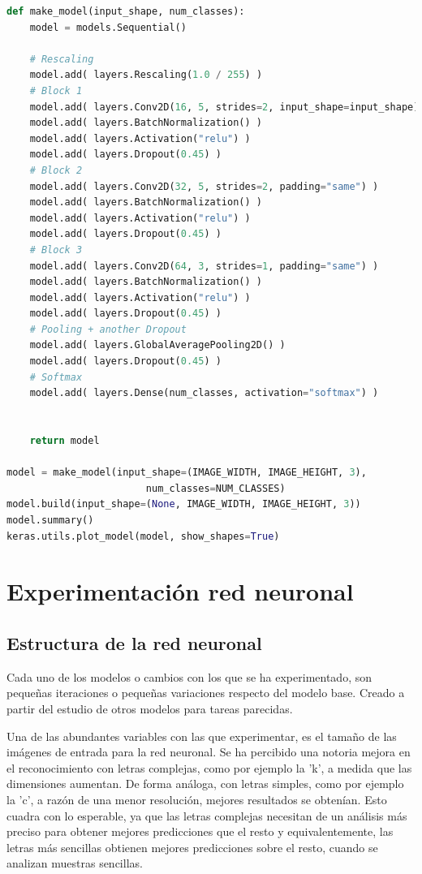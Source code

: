 \begin{appendices}
\begin{lstlisting}[language=python, title=Fragmento de \href{https://github.com/AntonioPriego/SmartPen/blob/main/Train/Train.ipynb}{\textit{Train.ipynb}}]
def make_model(input_shape, num_classes):
    model = models.Sequential()

    # Rescaling
    model.add( layers.Rescaling(1.0 / 255) )
    # Block 1
    model.add( layers.Conv2D(16, 5, strides=2, input_shape=input_shape) )
    model.add( layers.BatchNormalization() )
    model.add( layers.Activation("relu") )
    model.add( layers.Dropout(0.45) )
    # Block 2
    model.add( layers.Conv2D(32, 5, strides=2, padding="same") )
    model.add( layers.BatchNormalization() )
    model.add( layers.Activation("relu") )
    model.add( layers.Dropout(0.45) )
    # Block 3
    model.add( layers.Conv2D(64, 3, strides=1, padding="same") )
    model.add( layers.BatchNormalization() )
    model.add( layers.Activation("relu") )
    model.add( layers.Dropout(0.45) )
    # Pooling + another Dropout
    model.add( layers.GlobalAveragePooling2D() )
    model.add( layers.Dropout(0.45) )
    # Softmax
    model.add( layers.Dense(num_classes, activation="softmax") )


    return model

model = make_model(input_shape=(IMAGE_WIDTH, IMAGE_HEIGHT, 3),
                        num_classes=NUM_CLASSES)
model.build(input_shape=(None, IMAGE_WIDTH, IMAGE_HEIGHT, 3))
model.summary()
keras.utils.plot_model(model, show_shapes=True)
\end{lstlisting}

\section{Experimentación red neuronal}
\subsection{Estructura de la red neuronal\label{expRN}}
Cada uno de los modelos o cambios con los que se ha experimentado, son
pequeñas iteraciones o pequeñas variaciones respecto del modelo base.
Creado a partir del estudio de otros modelos para tareas parecidas.

Una de las abundantes variables con las que experimentar, es el
tamaño de las imágenes de entrada para la red neuronal. Se ha
percibido una notoria mejora en el reconocimiento con letras
complejas, como por ejemplo la 'k', a medida que las dimensiones aumentan. 
De forma análoga, con letras simples, como por ejemplo la 'c', a razón de
una menor resolución, mejores resultados se obtenían. Esto cuadra con lo
esperable, ya que las letras complejas necesitan de un análisis más preciso
para obtener mejores predicciones que el resto y equivalentemente, las letras
más sencillas obtienen mejores predicciones sobre el resto, cuando se analizan
muestras sencillas.


\end{appendices}
